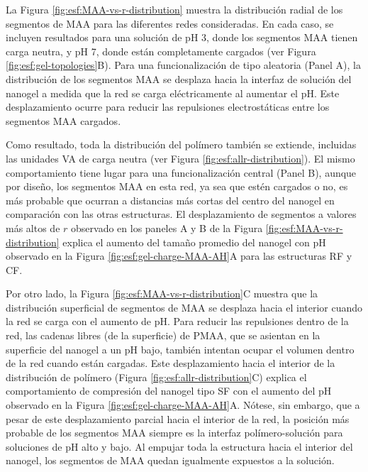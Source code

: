 La Figura \ref{fig:esf:MAA-vs-r-distribution} muestra la distribuci\'on radial de los segmentos de MAA para las diferentes redes consideradas. En cada caso, se incluyen resultados para una soluci\'on de pH 3, donde los segmentos MAA tienen carga neutra, y pH 7, donde est\'an completamente cargados (ver Figura \ref{fig:esf:gel-topologies}B). Para una funcionalizaci\'on de tipo aleatoria (Panel A), la distribuci\'on de los segmentos MAA se desplaza hacia la interfaz de soluci\'on del nanogel a medida que la red se carga el\'ectricamente al aumentar el pH. Este desplazamiento ocurre para reducir las repulsiones electrost\'aticas entre los segmentos MAA cargados.

Como resultado, toda la distribuci\'on del pol\'imero tambi\'en se extiende, incluidas las unidades VA de carga neutra (ver Figura \ref{fig:esf:allr-distribution}). El mismo comportamiento tiene lugar para una funcionalizaci\'on central (Panel B), aunque por dise\~no, los segmentos MAA en esta red, ya sea que est\'en cargados o no, es m\'as probable que ocurran a distancias m\'as cortas del centro del nanogel en comparaci\'on con las otras estructuras. El desplazamiento de segmentos a valores m\'as altos de $r$ observado en los paneles A y B de la Figura \ref{fig:esf:MAA-vs-r-distribution} explica el aumento del tama\~no promedio del nanogel con pH observado en la Figura \ref{fig:esf:gel-charge-MAA-AH}A para las estructuras RF y CF.

Por otro lado, la Figura \ref{fig:esf:MAA-vs-r-distribution}C muestra que la distribuci\'on superficial de segmentos de MAA se desplaza hacia el interior cuando la red se carga con el aumento de pH. Para reducir las repulsiones dentro de la red, las cadenas libres (de la superficie) de PMAA, que se asientan en la superficie del nanogel a un pH bajo, tambi\'en intentan ocupar el volumen dentro de la red cuando est\'an cargadas. Este desplazamiento hacia el interior de la distribuci\'on de pol\'imero (Figura \ref{fig:esf:allr-distribution}C) explica el comportamiento de compresi\'on del nanogel tipo SF con el aumento del pH observado en la Figura \ref{fig:esf:gel-charge-MAA-AH}A. N\'otese, sin embargo, que a pesar de este desplazamiento parcial hacia el interior de la red, la posici\'on m\'as probable de los segmentos MAA siempre es la interfaz pol\'imero-soluci\'on para soluciones de pH alto y bajo. Al empujar toda la estructura hacia el interior del nanogel, los segmentos de MAA quedan igualmente expuestos a la soluci\'on.



